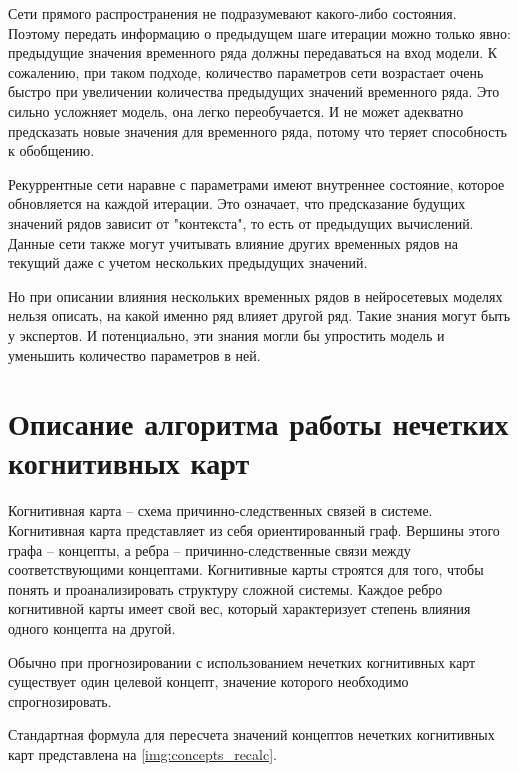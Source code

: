 Сети прямого распространения не подразумевают какого-либо состояния.
Поэтому передать информацию о предыдущем шаге итерации можно только явно:
предыдущие значения временного ряда должны передаваться на вход модели.
К сожалению, при таком подходе, количество параметров сети возрастает очень быстро
при увеличении количества предыдущих значений временного ряда. Это сильно усложняет модель,
она легко переобучается. И не может адекватно предсказать новые значения для временного ряда,
потому что теряет способность к обобщению.

Рекуррентные сети наравне с параметрами имеют внутреннее состояние, которое обновляется на каждой
итерации. Это означает, что предсказание будущих значений рядов зависит от "контекста",
то есть от предыдущих вычислений. Данные сети также могут учитывать влияние других
временных рядов на текущий даже с учетом нескольких предыдущих значений.

Но при описании влияния нескольких временных рядов в нейросетевых моделях
нельзя описать, на какой именно ряд влияет другой ряд. Такие знания могут быть у
экспертов. И потенциально, эти знания могли бы упростить модель и уменьшить количество
параметров в ней.



\section{Описание алгоритма работы нечетких когнитивных карт}

Когнитивная карта – схема причинно-следственных связей в системе.
Когнитивная карта представляет из себя ориентированный граф.
Вершины этого графа – концепты, а ребра – причинно-следственные связи между соответствующими концептами.
Когнитивные карты строятся для того, чтобы понять и проанализировать структуру сложной системы.
Каждое ребро когнитивной карты имеет свой вес, который характеризует степень влияния одного концепта на другой.

Обычно при прогнозировании с использованием нечетких когнитивных карт существует один целевой концепт,
значение которого необходимо спрогнозировать.


Стандартная формула для пересчета значений концептов нечетких когнитивных карт представлена на
\ref{img:concepts_recalc}.

